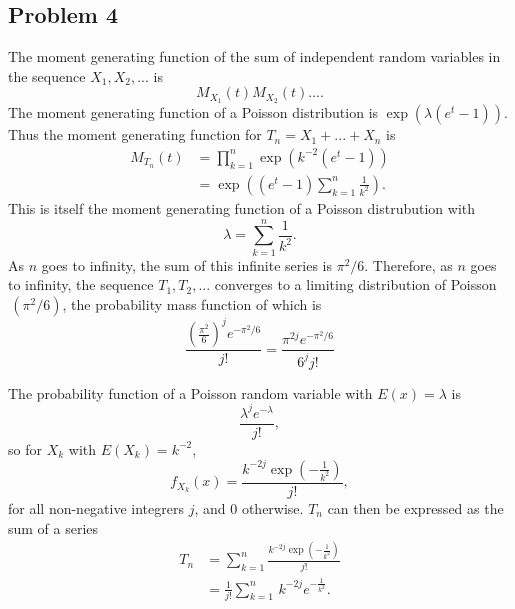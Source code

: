 \documentclass{article}
\begin{document}
\iffalse
We can now use Theorem 5.4.4 from the textbook to find an expression for the probability function of $\max\{X_1, ...\,, X_n\}$, the $n$-th order statistic of $X$:
\[\begin{aligned}
f_{X_{(n)}}(x) &= \frac{n!}{(n-1)!(n-n)!}f_X(x)\left[F_X(x)\right]^{n-1}\left[1-F_X(x)\right]^{n-n} \\
&= n\,f_X(x)\left[F_X(x)\right]^{n-1} \\
&= n\left(3(1-x)^2\right)\left[(x-1)^3 + 1\right]^{n-1}I_{(0,1)}(x)
\end{aligned}\]

On the domain $0<x<1$. We can find an expression for \[T_n = n^{1/3}\left(1-n\,f_X(x)\left[F_X(x)\right]^{n-1}.\right)\] While considering the limit with respect to $n$ of this function, it is important to note that $F_X \leq 1$ for all $x$ in the domain since it is a distribution function; therefore, $\left[F_X(x)\right]^{n-1}$ tends to zero as $n$ tends to infinity.
\fi

\subsection*{Problem 4}
The moment generating function of the sum of independent random variables in the sequence $X_1, X_2, ...$ is 
\[M_{X_1}(t)M_{X_2}(t)... .\]
The moment generating function of a Poisson distribution is $\exp(\lambda(e^t-1))$. Thus the moment generating function for $T_n = X_1 + ... + X_n$ is
\[\begin{aligned}M_{T_n}(t) &= \prod_{k=1}^{n} \exp\left(k^{-2}\left(e^t - 1\right)\right) \\
&= \exp\left(\left(e^t-1\right)\sum_{k=1}^{n} \frac{1}{k^2}\right).\end{aligned}\] 
This is itself the moment generating function of a Poisson distrubution with \[\lambda = \sum_{k=1}^{n} \frac{1}{k^2}.\]
As $n$ goes to infinity, the sum of this infinite series is $\pi^2/6$. Therefore, as $n$ goes to infinity, the sequence $T_1, T_2, ...$ converges to a limiting distribution of Poisson$\,\left(\pi^2/6\right)$, the probability mass function of which is 
\[\frac{\left(\frac{\pi^2}{6}\right)^je^{-\pi^2/6}}{j!} =  \frac{\pi^{2j} e^{-\pi^2/6}}{6^j j!}\]




\iffalse
The probability function of a Poisson random variable with $E(x) = \lambda$ is \[\frac{\lambda^je^{-\lambda}}{j!},\] so for $X_k$ with $E(X_k) = k^{-2}$, \[f_{X_k}(x) = \frac{k^{-2j}\exp\left(-\frac{1}{k^2}\right)}{j!},\] for all non-negative integrers $j$, and $0$ otherwise.
$T_n$ can then be expressed as the sum of a series 
\[\begin{aligned}
T_n &= \sum_{k=1}^{n}\frac{k^{-2j}\exp\left(-\frac{1}{k^2}\right)}{j!} \\
&=\frac{1}{j!}\sum_{k=1}^{n}\, k^{-2j}e^{-\frac{1}{k^2}}.\end{aligned}\]
\end{document}
